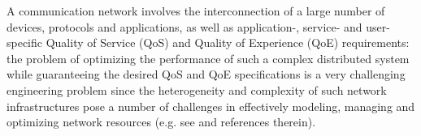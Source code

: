 A communication network involves the interconnection of a large number of devices, protocols and applications, as well as application-, service- and user-specific Quality of Service (QoS) and Quality of Experience (QoE) requirements: the problem of optimizing the performance of such a complex distributed system while guaranteeing the desired QoS and QoE specifications is a very challenging engineering problem since the heterogeneity and complexity of such network infrastructures pose a number of challenges in effectively modeling, managing and optimizing network resources (e.g. see \cite{Neely2010,Lemeshko2019} and references therein).

